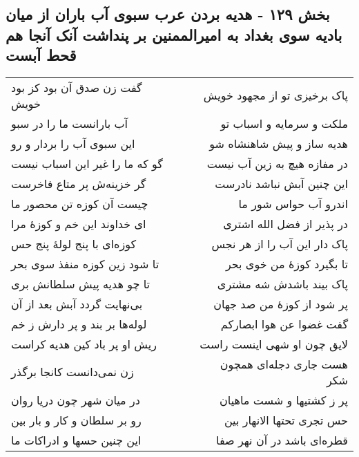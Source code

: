 \begin{center}
\section*{بخش ۱۲۹ - هدیه بردن عرب سبوی آب باران از میان بادیه سوی بغداد به امیرالممنین بر پنداشت آنک آنجا هم قحط آبست}
\label{sec:sh129}
\begin{longtable}{l p{0.5cm} r}
گفت زن صدق آن بود کز بود خویش
&&
پاک برخیزی تو از مجهود خویش
\\
آب بارانست ما را در سبو
&&
ملکت و سرمایه و اسباب تو
\\
این سبوی آب را بردار و رو
&&
هدیه ساز و پیش شاهنشاه شو
\\
گو که ما را غیر این اسباب نیست
&&
در مفازه هیچ به زین آب نیست
\\
گر خزینه‌ش پر متاع فاخرست
&&
این چنین آبش نباشد نادرست
\\
چیست آن کوزه تن محصور ما
&&
اندرو آب حواس شور ما
\\
ای خداوند این خم و کوزهٔ مرا
&&
در پذیر از فضل الله اشتری
\\
کوزه‌ای با پنج لولهٔ پنج حس
&&
پاک دار این آب را از هر نجس
\\
تا شود زین کوزه منفذ سوی بحر
&&
تا بگیرد کوزهٔ من خوی بحر
\\
تا چو هدیه پیش سلطانش بری
&&
پاک بیند باشدش شه مشتری
\\
بی‌نهایت گردد آبش بعد از آن
&&
پر شود از کوزهٔ من صد جهان
\\
لوله‌ها بر بند و پر دارش ز خم
&&
گفت غضوا عن هوا ابصارکم
\\
ریش او پر باد کین هدیه کراست
&&
لایق چون او شهی اینست راست
\\
زن نمی‌دانست کانجا برگذر
&&
هست جاری دجله‌ای همچون شکر
\\
در میان شهر چون دریا روان
&&
پر ز کشتیها و شست ماهیان
\\
رو بر سلطان و کار و بار بین
&&
حس تجری تحتها الانهار بین
\\
این چنین حسها و ادراکات ما
&&
قطره‌ای باشد در آن نهر صفا
\\
\end{longtable}
\end{center}
